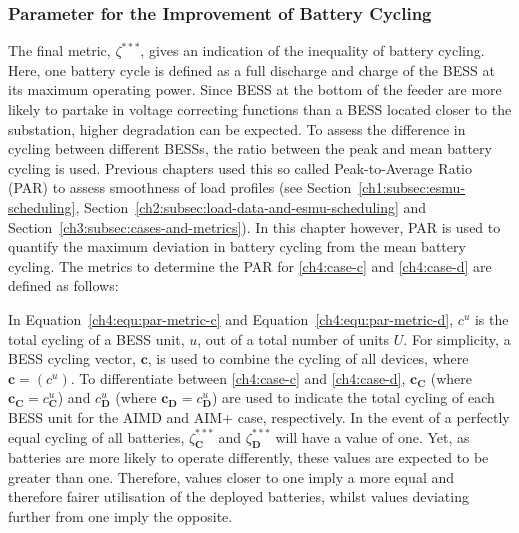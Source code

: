 \subsubsection{Parameter for the Improvement of Battery Cycling}

The final metric, $\zeta^{***}$, gives an indication of the inequality of battery cycling.
Here, one battery cycle is defined as a full discharge and charge of the BESS at its maximum operating power.
Since BESS at the bottom of the feeder are more likely to partake in voltage correcting functions than a BESS located closer to the substation, higher degradation can be expected.
To assess the difference in cycling between different BESSs, the ratio between the peak and mean battery cycling is used.
Previous chapters used this so called Peak-to-Average Ratio (PAR) to assess smoothness of load profiles (see Section~\ref{ch1:subsec:esmu-scheduling}, Section~\ref{ch2:subsec:load-data-and-esmu-scheduling} and Section~\ref{ch3:subsec:cases-and-metrics}).
In this chapter however, PAR is used to quantify the maximum deviation in battery cycling from the mean battery cycling.
The metrics to determine the PAR for \ref{ch4:case-c} and \ref{ch4:case-d} are defined as follows:




In Equation~\ref{ch4:equ:par-metric-c} and Equation~\ref{ch4:equ:par-metric-d}, $c^u$ is the total cycling of a BESS unit, $u$, out of a total number of units $U$.
For simplicity, a BESS cycling vector, $\textbf{c}$, is used to combine the cycling of all devices, where $\textbf{c} = (c^u)$.
To differentiate between \ref{ch4:case-c} and \ref{ch4:case-d}, $\textbf{c}_\textbf{C}$ (where $\textbf{c}_\textbf{C} = c^u_\textbf{C}$) and $c_\textbf{D}^u$ (where $\textbf{c}_\textbf{D} = c^u_\textbf{D}$) are used to indicate the total cycling of each BESS unit for the AIMD and AIM+ case, respectively.
In the event of a perfectly equal cycling of all batteries, $\zeta^{***}_\textbf{C}$ and $\zeta^{***}_\textbf{D}$ will have a value of one.
Yet, as batteries are more likely to operate differently, these values are expected to be greater than one.
Therefore, values closer to one imply a more equal and therefore fairer utilisation of the deployed batteries, whilst values deviating further from one imply the opposite.


